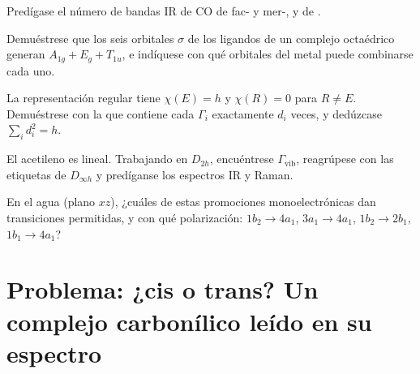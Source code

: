 \begin{exercise}[$\star\star$]\label{exo:b3:group-theory-applied:8}
Predígase el número de bandas IR de CO de fac- y mer-, y de
.
\end{exercise}

\begin{exercise}[$\star\star$]\label{exo:b3:group-theory-applied:9}
Demuéstrese que los seis orbitales $\sigma$ de los ligandos de un complejo octaédrico generan
$A_{1g} + E_g + T_{1u}$, e indíquese con qué orbitales del metal puede combinarse cada uno.
\end{exercise}

\begin{exercise}[$\star\star\star$]\label{exo:b3:group-theory-applied:10}
La representación regular tiene $\chi(E) = h$ y $\chi(R) = 0$ para $R \ne E$. Demuéstrese
con la  que contiene cada 
$\Gamma_i$ exactamente $d_i$ veces, y dedúzcase $\sum_id_i^2 = h$.
\end{exercise}

\begin{exercise}[$\star\star\star$]\label{exo:b3:group-theory-applied:11}
El acetileno  es lineal. Trabajando en $D_{2h}$, encuéntrese $\Gamma_{\mathrm{vib}}$, reagrúpese
con las etiquetas de $D_{\infty h}$ y predíganse los espectros IR y Raman.
\end{exercise}

\begin{exercise}[$\star\star\star$]\label{exo:b3:group-theory-applied:12}
En el agua (plano $xz$), ¿cuáles de estas promociones monoelectrónicas dan transiciones
permitidas, y con qué polarización: $1b_2 \to 4a_1$, $3a_1 \to 4a_1$,
$1b_2 \to 2b_1$, $1b_1 \to 4a_1$?
\end{exercise}

\section{Problema: ¿cis o trans? Un complejo carbonílico leído en su espectro}

